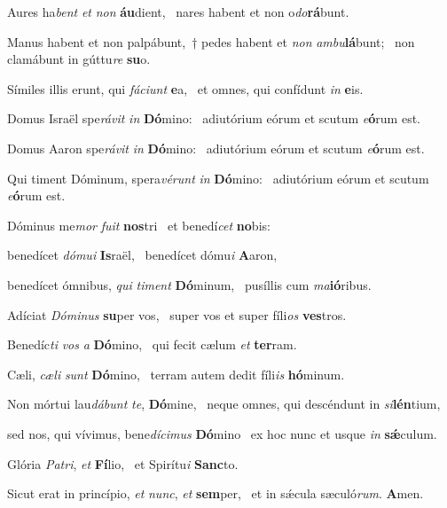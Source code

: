 \item Aures ha\textit{bent} \textit{et} \textit{non} \textbf{áu}dient,~\psstar{} nares habent et non o\textit{do}\textbf{rá}bunt.

\item Manus habent et non palpábunt,~† pedes habent et \textit{non} \textit{ambu}\textbf{lá}bunt;~\psstar{} non clamábunt in gúttu\textit{re} \textbf{su}o.

\item Símiles illis erunt, qui \textit{fáciunt} \textbf{e}a,~\psstar{} et omnes, qui confídunt \textit{in} \textbf{e}is.

\item Domus Israël spe\textit{rávit} \textit{in} \textbf{Dó}mino:~\psstar{} adiutórium eórum et scutum \textit{e}\textbf{ó}rum est.

\item Domus Aaron spe\textit{rávit} \textit{in} \textbf{Dó}mino:~\psstar{} adiutórium eórum et scutum \textit{e}\textbf{ó}rum est.

\item Qui timent Dóminum, spera\textit{vérunt} \textit{in} \textbf{Dó}mino:~\psstar{} adiutórium eórum et scutum \textit{e}\textbf{ó}rum est.

\item Dóminus me\textit{mor} \textit{fuit} \textbf{nos}tri~\psstar{} et benedí\textit{cet} \textbf{no}bis:

\item benedícet \textit{dómui} \textbf{Is}raël,~\psstar{} benedícet dómu\textit{i} \textbf{A}aron,

\item benedícet ómnibus, \textit{qui} \textit{timent} \textbf{Dó}minum,~\psstar{} pusíllis cum \textit{ma}\textbf{ió}ribus.

\item Adíciat \textit{Dóminus} \textbf{su}per vos,~\psstar{} super vos et super fíli\textit{os} \textbf{ves}tros.

\item Benedíc\textit{ti} \textit{vos} \textit{a} \textbf{Dó}mino,~\psstar{} qui fecit cælum \textit{et} \textbf{ter}ram.

\item Cæli, \textit{cæli} \textit{sunt} \textbf{Dó}mino,~\psstar{} terram autem dedit fíli\textit{is} \textbf{hó}minum.

\item Non mórtui lau\textit{dábunt} \textit{te}, \textbf{Dó}mine,~\psstar{} neque omnes, qui descéndunt in \textit{si}\textbf{lén}tium,

\item sed nos, qui vívimus, bene\textit{dícimus} \textbf{Dó}mino~\psstar{} ex hoc nunc et usque \textit{in} \textbf{sǽ}culum.

\item Glória \textit{Patri}, \textit{et} \textbf{Fí}lio,~\psstar{} et Spirítu\textit{i} \textbf{Sanc}to.

\item Sicut erat in princípio, \textit{et} \textit{nunc}, \textit{et} \textbf{sem}per,~\psstar{} et in sǽcula sæculó\textit{rum}. \textbf{A}men.